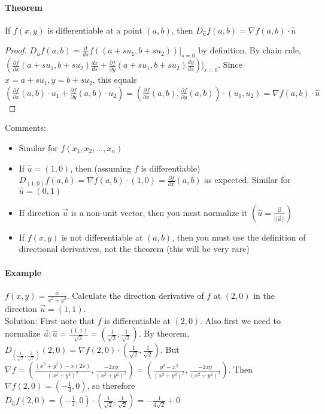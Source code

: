 \documentclass[tikz,10pt,letter]{article}
\theoremstyle{plain}
\theoremstyle{definition}
\begin{document}
\paragraph{Theorem} If $f(x,y)$ is differentiable at a point $(a,b)$, then $D_{\hat{u}}f(a,b)=\nabla f(a,b)\cdot\hat{u}$ 
\begin{proof}
     $D_{\hat{u}}f(a,b)=\frac{d}{ds}f((a+su_1,b+su_2))|_{s=0}$ by definition. By chain rule, $\left(\frac{\partial f}{\partial x}(a+su_1,b+su_2)\frac{dx}{ds}+\frac{\partial f}{\partial y}(a+su_1,b+su_2)\frac{dy}{ds}\right)|_{s=0}$. Since $x=a+su_1,y=b+su_2$, this equals $\left(\frac{\partial f}{\partial x}(a,b)\cdot u_1+\frac{\partial f}{\partial y}(a,b)\cdot u_2\right)=\left(\frac{\partial f}{\partial x}(a,b),\frac{\partial f}{\partial y}(a,b)\right)\cdot(u_1,u_2)=\nabla f(a,b)\cdot\hat{u}$
\end{proof}
Comments: 
\begin{itemize}
    \item Similar for $f(x_1,x_2,\ldots,x_n)$
    \item If $\hat{u}=(1,0)$, then (assuming $f$ is differentiable) $D_{(1,0)}f(a,b)=\nabla f(a,b)\cdot(1,0)=\frac{\partial f}{\partial x}(a,b)$ as expected. Similar for $\hat{u}=(0,1)$ 
    \item If direction $\vec{u}$ is a non-unit vector, then you must normalize it $\left(\hat{u}=\frac{\vec{u}}{||\vec{u}||}\right)$
    \item If $f(x,y)$ is not differentiable at $(a,b)$, then you must use the definition of directional derivatives, not the theorem (this will be very rare)
\end{itemize}
\paragraph{Example}
$f(x,y)=\frac{x}{x^2+y^2}$. Calculate the direction derivative of $f$ at $(2,0)$ in the direction $\vec{u}=(1,1)$. \\ 
Solution: First note that $f$ is differentiable at $(2,0)$. Also first we need to normalize $\vec{u}:\hat{u}=\frac{(1,1)}{\sqrt{2}}=\left(\frac{1}{\sqrt{2}},\frac{1}{\sqrt{2}}\right)$. By theorem, $D_{\left(\frac{1}{\sqrt{2}},\frac{1}{\sqrt{2}}\right)}(2,0)=\nabla f(2,0)\cdot(\frac{1}{\sqrt{2}},\frac{1}{\sqrt{2}})$. But $\nabla f=\left(\frac{(x^2+y^2)-x(2x)}{(x^2+y^2)^2},\frac{-2xy}{(x^2+y^2)^2}\right)=\left(\frac{y^2-x^2}{(x^2+y^2)^2},\frac{-2xy}{(x^2+y^2)^2}\right)$. Then $\nabla f(2,0)=\left(-\frac{1}{4},0\right)$, so therefore $D_{\hat{u}}f(2,0)=\left(-\frac{1}{4},0\right)\cdot\left(\frac{1}{\sqrt2},\frac{1}{\sqrt2}\right)=-\frac{1}{4\sqrt2}+0$
\end{document}
